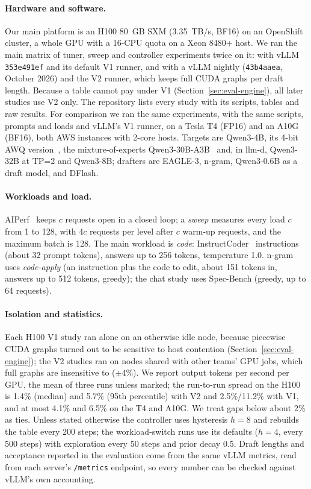 \documentclass{article}
\newcommand{\term}[1]{\emph{#1}}
\begin{document}
\paragraph{Hardware and software.} Our main platform is an H100 80~GB SXM (3.35~TB/s, BF16) on an OpenShift cluster, a whole GPU with a 16-CPU quota on a Xeon 8480+ host. We ran the main matrix of tuner, sweep and controller experiments twice on it: with vLLM \texttt{353e491ef} and its default V1 runner, and with a vLLM nightly (\texttt{43b4aaea}, October 2026) and the V2 runner, which keeps full CUDA graphs per draft length. Because a table cannot pay under V1 (Section~\ref{sec:eval-engine}), all later studies use V2 only. The repository lists every study with its scripts, tables and raw results. For comparison we ran the same experiments, with the same scripts, prompts and loads and vLLM's V1 runner, on a Tesla T4 (FP16) and an A10G (BF16), both AWS instances with 2-core hosts. Targets are Qwen3-4B, its 4-bit AWQ version~\cite{lin2024awq}, the mixture-of-experts Qwen3-30B-A3B~\cite{qwen3} and, in llm-d, Qwen3-32B at TP=2 and Qwen3-8B; drafters are EAGLE-3, n-gram, Qwen3-0.6B as a draft model, and DFlash.

\paragraph{Workloads and load.} AIPerf~\cite{aiperf} keeps $c$ requests open in a closed loop; a \term{sweep} measures every load $c$ from 1 to 128, with $4c$ requests per level after $c$ warm-up requests, and the maximum batch is 128. The main workload is \emph{code}: InstructCoder~\cite{li2024instructcoder} instructions (about 32 prompt tokens), answers up to 256 tokens, temperature 1.0. n-gram uses \emph{code-apply} (an instruction plus the code to edit, about 151 tokens in, answers up to 512 tokens, greedy); the chat study uses Spec-Bench (greedy, up to 64 requests).

\paragraph{Isolation and statistics.} Each H100 V1 study ran alone on an otherwise idle node, because piecewise CUDA graphs turned out to be sensitive to host contention (Section~\ref{sec:eval-engine}); the V2 studies ran on nodes shared with other teams' GPU jobs, which full graphs are insensitive to ($\pm$4\%). We report output tokens per second per GPU, the mean of three runs unless marked; the run-to-run spread on the H100 is 1.4\% (median) and 5.7\% (95th percentile) with V2 and 2.5\%/11.2\% with V1, and at most 4.1\% and 6.5\% on the T4 and A10G. We treat gaps below about 2\% as ties. Unless stated otherwise the controller uses hysteresis $h=8$ and rebuilds the table every 200 steps; the workload-switch runs use its defaults ($h=4$, every 500 steps) with exploration every 50 steps and prior decay 0.5. Draft lengths and acceptance reported in the evaluation come from the same vLLM metrics, read from each server's \texttt{/metrics} endpoint, so every number can be checked against vLLM's own accounting.
\end{document}
